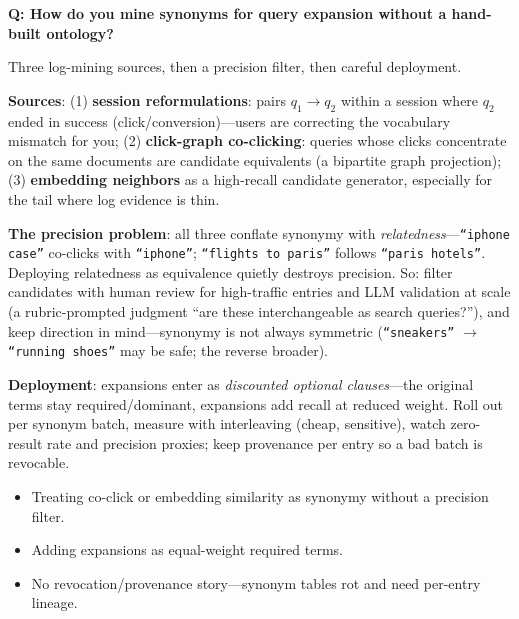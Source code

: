 \begin{interviewq}
\textbf{Q: How do you mine synonyms for query expansion without a hand-built ontology?}

 \quad {} \quad \badgefreq{\freqmed}

\stronganswer

Three log-mining sources, then a precision filter, then careful deployment.

\textbf{Sources}: (1) \textbf{session reformulations}: pairs $q_1 \to q_2$ within a session where $q_2$ ended in success (click/conversion)---users are correcting the vocabulary mismatch for you; (2) \textbf{click-graph co-clicking}: queries whose clicks concentrate on the same documents are candidate equivalents (a bipartite graph projection); (3) \textbf{embedding neighbors} as a high-recall candidate generator, especially for the tail where log evidence is thin.

\textbf{The precision problem}: all three conflate synonymy with \textit{relatedness}---\texttt{``iphone case''} co-clicks with \texttt{``iphone''}; \texttt{``flights to paris''} follows \texttt{``paris hotels''}. Deploying relatedness as equivalence quietly destroys precision. So: filter candidates with human review for high-traffic entries and LLM validation at scale (a rubric-prompted judgment ``are these interchangeable as search queries?''), and keep direction in mind---synonymy is not always symmetric (\texttt{``sneakers''} $\to$ \texttt{``running shoes''} may be safe; the reverse broader).

\textbf{Deployment}: expansions enter as \textit{discounted optional clauses}---the original terms stay required/dominant, expansions add recall at reduced weight. Roll out per synonym batch, measure with interleaving (cheap, sensitive), watch zero-result rate and precision proxies; keep provenance per entry so a bad batch is revocable.

\redflags
\begin{itemize}
    \item Treating co-click or embedding similarity as synonymy without a precision filter.
    \item Adding expansions as equal-weight required terms.
    \item No revocation/provenance story---synonym tables rot and need per-entry lineage.
\end{itemize}



\end{interviewq}
